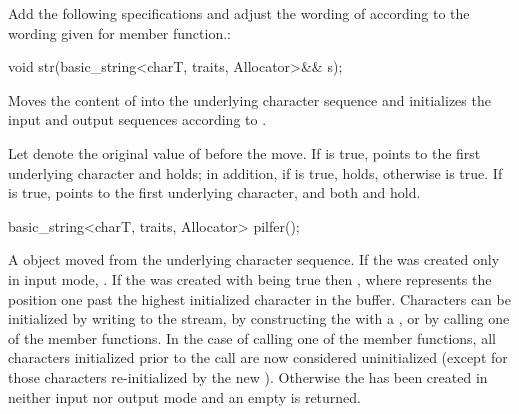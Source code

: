 \documentclass[ebook,11pt,article]{memoir}
\begin{document}
Add the following specifications and adjust the wording of  according to the wording given for  member function.:
\begin{insrt}
\begin{itemdecl}
void str(basic_string<charT, traits, Allocator>&& s);
\end{itemdecl}
\begin{itemdescr}
\pnum
\effects 
Moves the content of  into the  underlying character sequence and initializes the input and output sequences according to .

\pnum
\postconditions
Let  denote the original value of  before the move.
If  is true,  points to the first underlying character and  holds; in addition, if  is true,  holds, otherwise  is true. If  is true,  points to the first underlying character, and both  and  hold.
\end{itemdescr}

\begin{itemdecl}
basic_string<charT, traits, Allocator> pilfer();
\end{itemdecl}
\begin{itemdescr}

\pnum
\returns A  object moved from the  underlying character sequence. If the  was created only in input mode, . If the  was created with  being true then , where  represents the position one past the highest initialized character in the buffer. Characters can be initialized by writing to the stream, by constructing the  with a , or by calling one of the  member functions. In the case of calling one of the  member functions, all characters initialized prior to the call are now considered uninitialized (except for those characters re-initialized by the new ). Otherwise the  has been created in neither input nor output mode and an empty  is returned. 


\end{itemdescr}
\end{insrt}
\end{document}
